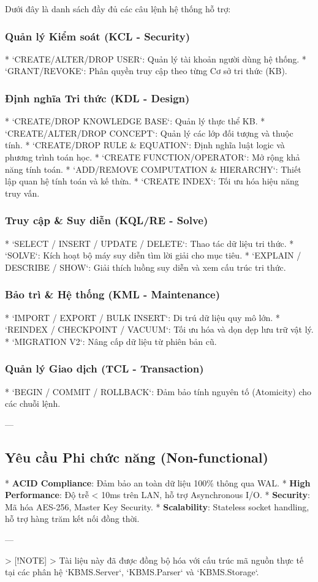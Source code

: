 Dưới đây là danh sách đầy đủ các câu lệnh hệ thống hỗ trợ:

\subsubsection{Quản lý Kiểm soát (KCL - Security)}
*   `CREATE/ALTER/DROP USER`: Quản lý tài khoản người dùng hệ thống.
*   `GRANT/REVOKE`: Phân quyền truy cập theo từng Cơ sở tri thức (KB).

\subsubsection{Định nghĩa Tri thức (KDL - Design)}
*   `CREATE/DROP KNOWLEDGE BASE`: Quản lý thực thể KB.
*   `CREATE/ALTER/DROP CONCEPT`: Quản lý các lớp đối tượng và thuộc tính.
*   `CREATE/DROP RULE \& EQUATION`: Định nghĩa luật logic và phương trình toán học.
*   `CREATE FUNCTION/OPERATOR`: Mở rộng khả năng tính toán.
*   `ADD/REMOVE COMPUTATION \& HIERARCHY`: Thiết lập quan hệ tính toán và kế thừa.
*   `CREATE INDEX`: Tối ưu hóa hiệu năng truy vấn.

\subsubsection{Truy cập & Suy diễn (KQL/RE - Solve)}
*   `SELECT / INSERT / UPDATE / DELETE`: Thao tác dữ liệu tri thức.
*   `SOLVE`: Kích hoạt bộ máy suy diễn tìm lời giải cho mục tiêu.
*   `EXPLAIN / DESCRIBE / SHOW`: Giải thích luồng suy diễn và xem cấu trúc tri thức.

\subsubsection{Bảo trì & Hệ thống (KML - Maintenance)}
*   `IMPORT / EXPORT / BULK INSERT`: Di trú dữ liệu quy mô lớn.
*   `REINDEX / CHECKPOINT / VACUUM`: Tối ưu hóa và dọn dẹp lưu trữ vật lý.
*   `MIGRATION V2`: Nâng cấp dữ liệu từ phiên bản cũ.

\subsubsection{Quản lý Giao dịch (TCL - Transaction)}
*   `BEGIN / COMMIT / ROLLBACK`: Đảm bảo tính nguyên tố (Atomicity) cho các chuỗi lệnh.

---

\subsection{Yêu cầu Phi chức năng (Non-functional)}

*   \textbf{ACID Compliance}: Đảm bảo an toàn dữ liệu 100\% thông qua WAL.
*   \textbf{High Performance}: Độ trễ < 10ms trên LAN, hỗ trợ Asynchronous I/O.
*   \textbf{Security}: Mã hóa AES-256, Master Key Security.
*   \textbf{Scalability}: Stateless socket handling, hỗ trợ hàng trăm kết nối đồng thời.

---

> [!NOTE]
> Tài liệu này đã được đồng bộ hóa với cấu trúc mã nguồn thực tế tại các phân hệ `KBMS.Server`, `KBMS.Parser` và `KBMS.Storage`.

